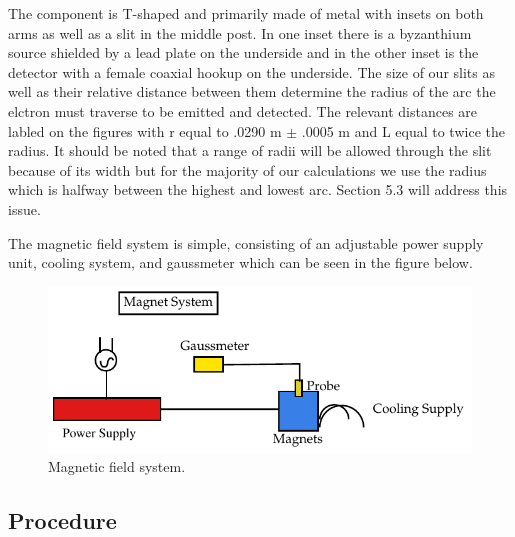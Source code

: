 The component is T-shaped and primarily made of metal with insets on both arms as well as a slit in the middle post.  In one inset there is a byzanthium source shielded by a lead plate on the underside and in the other inset is the detector with a female coaxial hookup on the underside.  The size of our slits as well as their relative distance between them  determine the radius of the arc the elctron must traverse to be emitted and detected. The relevant distances are labled on the figures with r equal to .0290 m $\pm$ .0005 m and L equal to twice the radius.  It should be noted that a range of radii will be allowed through the slit because of its width but for the majority of our calculations we use the radius which is halfway between the highest and lowest arc. Section 5.3 will address this issue. 

The magnetic field system is simple, consisting of an adjustable power supply unit, cooling system, and gaussmeter which can be seen in the figure below. 

\begin{figure}[H]
\begin{center}
\includegraphics[width=4 in]{REM-figures3.pdf}
\caption{Magnetic field system.}
\end{center}
\end{figure}

\subsection{Procedure}

